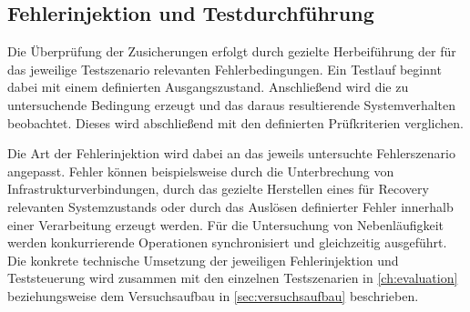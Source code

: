 \subsection{Fehlerinjektion und Testdurchführung}
\label{subsec:fehlerinjektion_und_testdurchfuehrung}
Die Überprüfung der Zusicherungen erfolgt durch gezielte Herbeiführung der für das jeweilige Testszenario relevanten Fehlerbedingungen.
Ein Testlauf beginnt dabei mit einem definierten Ausgangszustand.
Anschließend wird die zu untersuchende Bedingung erzeugt und das daraus resultierende Systemverhalten beobachtet.
Dieses wird abschließend mit den definierten Prüfkriterien verglichen.

Die Art der Fehlerinjektion wird dabei an das jeweils untersuchte Fehlerszenario angepasst.
Fehler können beispielsweise durch die Unterbrechung von Infrastrukturverbindungen, durch das gezielte Herstellen eines
für Recovery relevanten Systemzustands oder durch das Auslösen definierter Fehler innerhalb einer Verarbeitung erzeugt werden.
Für die Untersuchung von Nebenläufigkeit werden konkurrierende Operationen synchronisiert und gleichzeitig ausgeführt.
Die konkrete technische Umsetzung der jeweiligen Fehlerinjektion und Teststeuerung wird zusammen mit den einzelnen Testszenarien
in \cref{ch:evaluation} beziehungsweise dem Versuchsaufbau in \cref{sec:versuchsaufbau} beschrieben.

